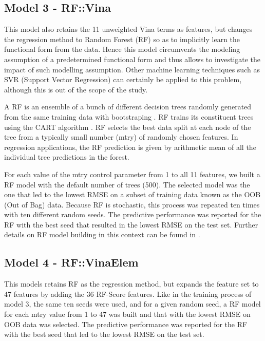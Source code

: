 \documentclass[twocolumn]{bmcart}
\begin{document}
\subsection*{Model 3 - RF::Vina}

This model also retains the 11 unweighted Vina terms as features, but changes the regression method to Random Forest (RF) \cite{1309} so as to implicitly learn the functional form from the data. Hence this model circumvents the modeling assumption of a predetermined functional form and thus allows to investigate the impact of such modelling assumption. Other machine learning techniques such as SVR (Support Vector Regression) \cite{1295} can certainly be applied to this problem, although this is out of the scope of the study.

A RF is an ensemble of a bunch of different decision trees randomly generated from the same training data with bootstraping \cite{1309}. RF trains its constituent trees using the CART algorithm \cite{1310}. RF selects the best data split at each node of the tree from a typically small number (mtry) of randomly chosen features. In regression applications, the RF prediction is given by arithmetic mean of all the individual tree predictions in the forest.

For each value of the mtry control parameter from 1 to all 11 features, we built a RF model with the default number of trees (500). The selected model was the one that led to the lowest RMSE on a subset of training data known as the OOB (Out of Bag) data. Because RF is stochastic, this process was repeated ten times with ten different random seeds. The predictive performance was reported for the RF with the best seed that resulted in the lowest RMSE on the test set. Further details on RF model building in this context can be found in \cite{1647}.

\subsection*{Model 4 - RF::VinaElem}

This models retains RF as the regression method, but expands the feature set to 47 features by adding the 36 RF-Score \cite{564} features. Like in the training process of model 3, the same ten seeds were used, and for a given random seed, a RF model for each mtry value from 1 to 47 was built and that with the lowest RMSE on OOB data was selected. The predictive performance was reported for the RF with the best seed that led to the lowest RMSE on the test set.
\end{document}
